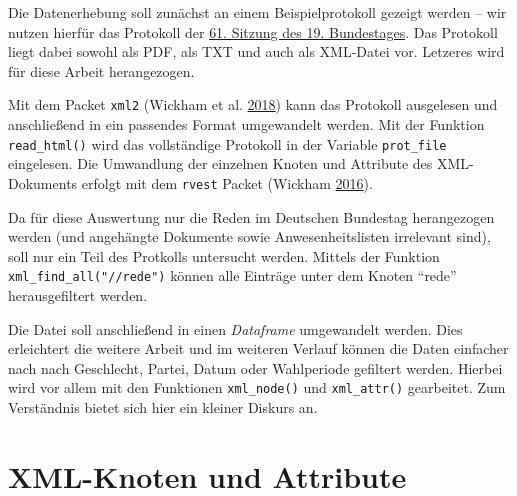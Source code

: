 \documentclass[oneside, 12pt]{scrbook}
\newenvironment{Shaded}{\begin{snugshade}}{\end{snugshade}}
\newcommand{\KeywordTok}[1]{\textcolor[rgb]{0.13,0.29,0.53}{\textbf{#1}}}
\newcommand{\NormalTok}[1]{#1}
\newcommand{\OperatorTok}[1]{\textcolor[rgb]{0.81,0.36,0.00}{\textbf{#1}}}
\newcommand{\StringTok}[1]{\textcolor[rgb]{0.31,0.60,0.02}{#1}}
\theoremstyle{definition}
\theoremstyle{definition}
\theoremstyle{definition}
\theoremstyle{remark}
\begin{document}
Die Datenerhebung soll zunächst an einem Beispielprotokoll gezeigt
werden -- wir nutzen hierfür das Protokoll der
\href{https://www.bundestag.de/blob/577958/b2d1fce9b7dec32a1403a2ec5f6bc58d/19061-data.xml}{61.
Sitzung des 19. Bundestages}. Das Protokoll liegt dabei sowohl als PDF,
als TXT und auch als XML-Datei vor. Letzeres wird für diese Arbeit
herangezogen.

Mit dem Packet \texttt{xml2} (Wickham et al.
\protect\hyperlink{ref-wickham_2018}{2018}) kann das Protokoll
ausgelesen und anschließend in ein passendes Format umgewandelt werden.
Mit der Funktion \texttt{read\_html()} wird das vollständige Protokoll
in der Variable \texttt{prot\_file} eingelesen. Die Umwandlung der
einzelnen Knoten und Attribute des XML-Dokuments erfolgt mit dem
\texttt{rvest} Packet (Wickham
\protect\hyperlink{ref-wickham_2016}{2016}).

Da für diese Auswertung nur die Reden im Deutschen Bundestag
herangezogen werden (und angehängte Dokumente sowie Anwesenheitslisten
irrelevant sind), soll nur ein Teil des Protkolls untersucht werden.
Mittels der Funktion \texttt{xml\_find\_all("//rede")} können alle
Einträge unter dem Knoten ``rede'' herausgefiltert werden.

\begin{Shaded}
\end{Shaded}

Die Datei soll anschließend in einen \emph{Dataframe} umgewandelt
werden. Dies erleichtert die weitere Arbeit und im weiteren Verlauf
können die Daten einfacher nach nach Geschlecht, Partei, Datum oder
Wahlperiode gefiltert werden. Hierbei wird vor allem mit den Funktionen
\texttt{xml\_node()} und \texttt{xml\_attr()} gearbeitet. Zum
Verständnis bietet sich hier ein kleiner Diskurs an.

\hypertarget{xml-knoten-und-attribute}{%
\section{XML-Knoten und Attribute}\label{xml-knoten-und-attribute}}
\end{document}
